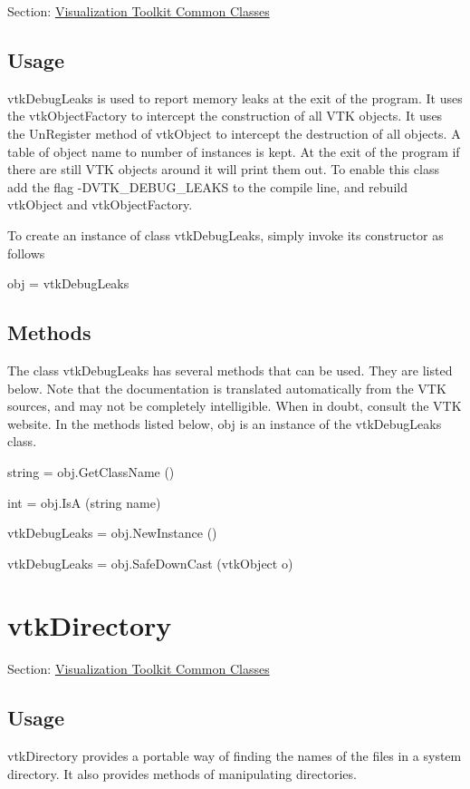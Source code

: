 Section\-: \hyperlink{sec_vtkcommon}{Visualization Toolkit Common Classes} \hypertarget{vtkwidgets_vtkxyplotwidget_Usage}{}\subsection{Usage}\label{vtkwidgets_vtkxyplotwidget_Usage}
vtk\-Debug\-Leaks is used to report memory leaks at the exit of the program. It uses the vtk\-Object\-Factory to intercept the construction of all V\-T\-K objects. It uses the Un\-Register method of vtk\-Object to intercept the destruction of all objects. A table of object name to number of instances is kept. At the exit of the program if there are still V\-T\-K objects around it will print them out. To enable this class add the flag -\/\-D\-V\-T\-K\-\_\-\-D\-E\-B\-U\-G\-\_\-\-L\-E\-A\-K\-S to the compile line, and rebuild vtk\-Object and vtk\-Object\-Factory.

To create an instance of class vtk\-Debug\-Leaks, simply invoke its constructor as follows \begin{DoxyVerb}  obj = vtkDebugLeaks
\end{DoxyVerb}
 \hypertarget{vtkwidgets_vtkxyplotwidget_Methods}{}\subsection{Methods}\label{vtkwidgets_vtkxyplotwidget_Methods}
The class vtk\-Debug\-Leaks has several methods that can be used. They are listed below. Note that the documentation is translated automatically from the V\-T\-K sources, and may not be completely intelligible. When in doubt, consult the V\-T\-K website. In the methods listed below, {\ttfamily obj} is an instance of the vtk\-Debug\-Leaks class. 
\begin{DoxyItemize}
\item {\ttfamily string = obj.\-Get\-Class\-Name ()}  
\item {\ttfamily int = obj.\-Is\-A (string name)}  
\item {\ttfamily vtk\-Debug\-Leaks = obj.\-New\-Instance ()}  
\item {\ttfamily vtk\-Debug\-Leaks = obj.\-Safe\-Down\-Cast (vtk\-Object o)}  
\end{DoxyItemize}\hypertarget{vtkcommon_vtkdirectory}{}\section{vtk\-Directory}\label{vtkcommon_vtkdirectory}
Section\-: \hyperlink{sec_vtkcommon}{Visualization Toolkit Common Classes} \hypertarget{vtkwidgets_vtkxyplotwidget_Usage}{}\subsection{Usage}\label{vtkwidgets_vtkxyplotwidget_Usage}
vtk\-Directory provides a portable way of finding the names of the files in a system directory. It also provides methods of manipulating directories.

